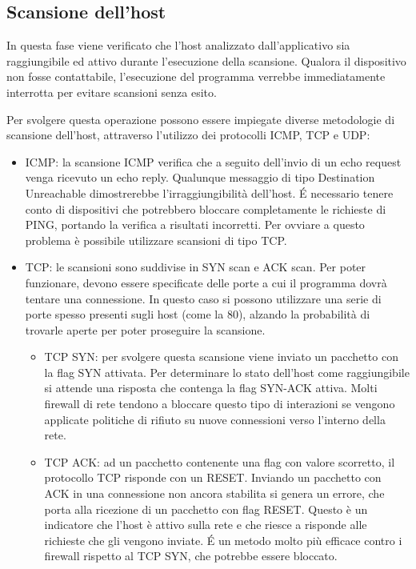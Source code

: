 \documentclass[12pt]{report}
\begin{document}
\subsection{Scansione dell'host}
\label{sec:scan_host}

In questa fase viene verificato che l'host analizzato dall'applicativo sia raggiungibile ed attivo durante l'esecuzione della scansione. Qualora il dispositivo non fosse contattabile, l'esecuzione del programma verrebbe immediatamente interrotta per evitare scansioni senza esito.

Per svolgere questa operazione possono essere impiegate diverse metodologie di scansione dell'host, attraverso l'utilizzo dei protocolli ICMP, TCP e UDP:
\begin{itemize}
    \item ICMP: la scansione ICMP verifica che a seguito dell'invio di un echo request venga ricevuto un echo reply. Qualunque messaggio di tipo Destination Unreachable dimostrerebbe l'irraggiungibilità dell'host. \'{E} necessario tenere conto di dispositivi che potrebbero bloccare completamente le richieste di PING, portando la verifica a risultati incorretti. Per ovviare a questo problema è possibile utilizzare scansioni di tipo TCP.
    \item TCP: le scansioni sono suddivise in SYN scan e ACK scan. Per poter funzionare, devono essere specificate delle porte a cui il programma dovrà tentare una connessione. In questo caso si possono utilizzare una serie di porte spesso presenti sugli host (come la 80), alzando la probabilità di trovarle aperte per poter proseguire la scansione.
    \begin{itemize}
        \item TCP SYN: per svolgere questa scansione viene inviato un pacchetto con la flag SYN attivata. Per determinare lo stato dell'host come raggiungibile si attende una risposta che contenga la flag SYN-ACK attiva. Molti firewall di rete tendono a bloccare questo tipo di interazioni se vengono applicate politiche di rifiuto su nuove connessioni verso l'interno della rete.
        \item TCP ACK: ad un pacchetto contenente una flag con valore scorretto, il protocollo TCP risponde con un RESET. Inviando un pacchetto con ACK in una connessione non ancora stabilita si genera un errore, che porta alla ricezione di un pacchetto con flag RESET. Questo è un indicatore che l'host è attivo sulla rete e che riesce a risponde alle richieste che gli vengono inviate. \'{E} un metodo molto più efficace contro i firewall rispetto al TCP SYN, che potrebbe essere bloccato.

\end{itemize}
\end{itemize}
\end{document}
